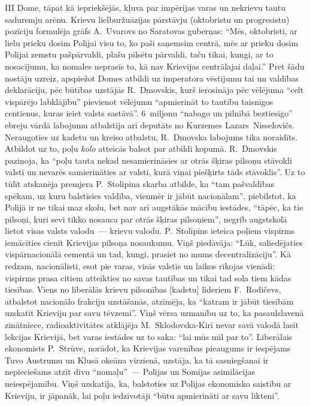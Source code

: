 \documentclass[twoside,a5paper,12pt,fleqn,openany]{extbook}
\newcommand{\pltxti}[1]{\textit{\textpolish{#1}}}
\begin{document}
III Dome, tāpat kā iepriekšējās, kļuva par impērijas varas un nekrievu tautu sadursmju arēnu. Krievu lielburžuāzijas pārstāvju (oktobristu un progresistu) pozīciju formulēja grāfs A.~Uvarovs no Saratovas guberņas: ``Mēs, oktobristi, ar lielu prieku dosim Polijai visu to, ko paši saņemsim centrā, mēs ar prieku dosim Polijai zemstu pašpārvaldi, plašu pilsētu pārvaldi, taču tikai, kungi, ar to nosacījumu, ka nomales neprasīs to, kā nav Krievijas centrālajai daļai.'' Pret šādu nostāju uzreiz, apspiežot Domes atbildi uz imperatora vēstījumu tai un valdības deklarāciju, pēc būtības uzstājās R.~Dmovskis, kurš ierosināja pēc vēlējuma ``celt vispārējo labklājību'' pievienot vēlējumu ``apmierināt to tautību taisnīgos centienus, kuras ieiet valsts sastāvā''. 6~miljonu ``nabago un pilnībā beztiesīgo'' ebreju vārdā labojumu atbalstīja arī deputāts no Kurzemes Lazars~Nisselovičs. Neraugoties uz kadetu un kreiso atbalstu, R.~Dmovska labojums tika noraidīts. Atbildot uz to, poļu \pltxti{kolo} atteicās balsot par atbildi kopumā. R.~Dmovskis paziņoja, ka ``poļu tauta nekad nesamierināsies ar otrās šķiras pilsoņu stāvokli valstī un nevarēs samierināties ar valsti, kurā viņai piešķirts tāds stāvoklis''. Uz to tūlīt atskanēja premjera P.~Stolipina skarba atbilde, ka ``tam pašvaldības spēkam, uz kuru balstīsies valdība, vienmēr ir jābūt nacionālam'', piebilstot, ka Polijā ir ne tikai maz skolu, bet nav arī augstākās mācību iestādes, ``tāpēc, ka tie pilsoņi, kuri sevi tikko nosauca par otrās šķiras pilsoņiem'', negrib augstskolā lietot visas valsts valodu~--- krievu valodu. P.~Stolipins ieteica poļiem vispirms iemācīties cienīt Krievijas pilsoņa nosaukumu. Viņš piedāvāja: ``Lūk, saliedējaties vispārnacionālā cementā un tad, kungi, prasiet no mums decentralizāciju''. Kā redzam, nacionālisti, esot pie varas, visās valstīs un laikos rīkojas vienādi: vispirms prasa citiem atteikties no savas tautības un tikai tad sola tiem kādas tiesības. Viens no liberālās krievu pilsonības [kadetu] līderiem F.~Rodičevs, atbalstot nacionālo frakciju uzstāšanās, atzīmēja, ka ``katram ir jābūt tiesībām uzskatīt Krieviju par savu tēvzemi''. Viņš vērsa uzmanību uz to, ka pasaulslavenā zinātniece, radioaktivitātes atklājēja M.~Sklodovska-Kirī nevar savā valodā lasīt lekcijas Krievijā, bet varas iestādes uz to saka: ``lai mūs mīl par to''. Liberālais ekonomists P.~Strūve, norādot, ka Krievijas varenības pieaugums ir iespējams Tuvo Austrumu un Klusā okeāna virzienā, uzstāja, ka tā sasniegšanai ir nepieciešams atzīt divu ``nomaļu''~--- Polijas un Somijas asimilācijas neiespējamību. Viņš uzskatīja, ka, balstoties uz Polijas ekonomisko saistību ar Krieviju, ir jāpanāk, lai poļu iedzīvotāji ``būtu apmierināti ar savu likteni''.
\end{document}
